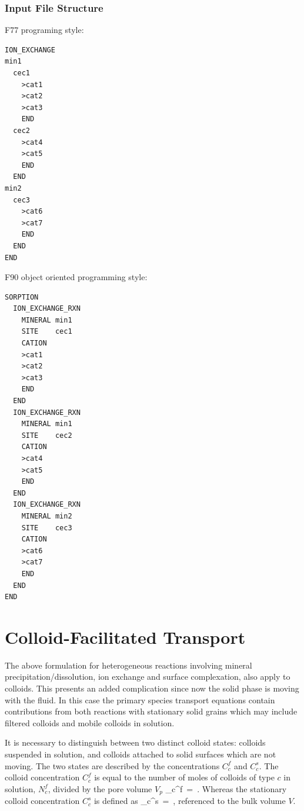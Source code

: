 \documentclass[12pt]{article}
\def\EQ#1\EN{\begin{equation}#1\end{equation}}
\newcommand{\eq}{\ =\ }
\begin{document}
\subsubsection{Input File Structure}

F77 programing style:
\small
\begin{verbatim}
ION_EXCHANGE
min1 
  cec1
    >cat1
    >cat2
    >cat3
    END
  cec2
    >cat4
    >cat5
    END
  END
min2 
  cec3
    >cat6
    >cat7
    END
  END
END
\end{verbatim}
\normalsize

\noindent
F90 object oriented programming style:
\small
\begin{verbatim}
SORPTION
  ION_EXCHANGE_RXN
    MINERAL min1
    SITE    cec1
    CATION
    >cat1
    >cat2
    >cat3
    END
  END
  ION_EXCHANGE_RXN
    MINERAL min1
    SITE    cec2
    CATION
    >cat4
    >cat5
    END
  END
  ION_EXCHANGE_RXN
    MINERAL min2
    SITE    cec3
    CATION
    >cat6
    >cat7
    END
  END
END
\end{verbatim}
\normalsize

\section{Colloid-Facilitated Transport}

\setcounter{equation}{0}

The above formulation for heterogeneous reactions involving mineral precipitation/dis\-solution, ion exchange and surface complexation, also apply to colloids. This presents an added complication since now the solid phase is moving with the fluid. 
In this case the primary species transport equations contain contributions from both reactions with stationary solid grains which may include filtered colloids and mobile colloids in solution. 

It is necessary to distinguish between two distinct colloid states: colloids suspended in solution, and colloids attached to solid surfaces which are not moving. The two states are described by the concentrations $C_c^f$ and $C_c^s$.
The colloid concentration $C_c^f$ is equal to the number of moles of colloids of type $c$ in solution, $N_c^{f}$, divided by the pore volume $V_p$
\EQ
C_c^f\eq{}.
\EN
Whereas the stationary colloid concentration $C_c^s$ is defined as
\EQ
C_c^s\eq{},
\EN
referenced to the bulk volume $V$.
\end{document}
